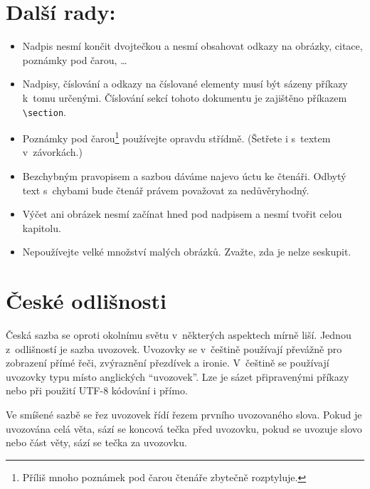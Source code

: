 \documentclass[twocolumn, 10pt, a4paper]{article}
\begin{document}
\section{Další rady:}
\label{section:3}
    \begin{itemize}
        \item{
            Nadpis nesmí končit dvojtečkou a nesmí obsahovat odkazy na obrázky, citace, poznámky pod čarou, \dots
        }
        \item{
            Nadpisy, číslování a odkazy na číslované elementy musí být sázeny příkazy k~tomu určenými. Číslo\-vání sekcí tohoto dokumentu je zajištěno příkazem \verb|\section|.
        }
        \item{
            Poznámky pod čarou\footnote{
                    Příliš mnoho poznámek pod čarou čtenáře zbytečně rozptyluje.
                }
            používejte opravdu střídmě. (Šetřete i s~textem v~závorkách.)
        }
        \item{
            Bezchybným pravopisem a sazbou dáváme najevo úctu ke čtenáři. Odbytý text s~chybami bude čtenář právem považovat za nedůvěryhodný.
        }
        \item{
            Výčet ani obrázek nesmí začínat hned pod nadpisem a nesmí tvořit celou kapitolu.
        }
        \item{
            Nepoužívejte velké množství malých obrázků. Zvažte, zda je nelze seskupit.
        }
    \end{itemize}

\section{České odlišnosti}
    Česká sazba se oproti okolnímu světu v~některých aspektech mírně liší.
    Jednou z~odlišností je sazba uvozovek.
    Uvozovky se v~češtině používají převážně pro zobrazení přímé řeči, zvýraznění přezdívek a ironie.
    V~češtině se používají uvozovky typu  místo anglických ``uvozovek''.
    Lze je sázet připravenými příkazy nebo při použití UTF-8 kódování i přímo.
    
    Ve smíšené sazbě se řez uvozovek řídí řezem prvního uvozovaného slova.
    Pokud je uvozována celá věta, sází se koncová tečka před uvozovku, pokud se uvozuje slovo nebo část věty, sází se tečka za uvozovku.
    
\end{document}
